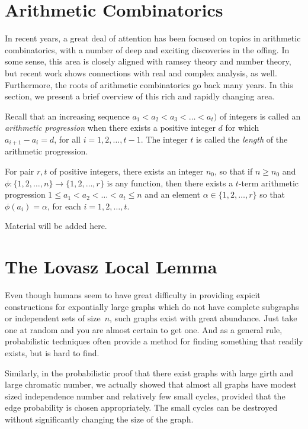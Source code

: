 \section{Arithmetic Combinatorics}

In recent years, a great deal of attention has been focused on
topics in arithmetic combinatorics, with a number of deep and
exciting discoveries in the offing.  In some sense, this area
is closely aligned with ramsey theory and number theory, but recent work 
shows connections with real and complex analysis, as well.  Furthermore,
the roots of arithmetic combinatorics go back many years.  In this section, 
we present a brief overview of this rich and rapidly changing area.

Recall that an increasing sequence $a_1<a_2<a_3<\dots<a_t)$ of integers is
called an \textit{arithmetic progression} when there exists a
positive integer $d$ for which $a_{i+1}-a_i=d$, for all $i=1,2,\dots,t-1$.
The integer $t$ is called the \textit{length} of the arithmetic progression.

\begin{theorem}
For pair $r,t$ of positive integers, there exists an integer $n_0$, so that
if $n\ge n_0$ and $\phi:\{1,2,\dots,n\}\rightarrow\{1,2,\dots,r\}$ is any
function, then there exists a $t$-term arithmetic progression
$1\le a_1<a_2<\dots<a_t\le n$ and an element $\alpha\in\{1,2,\dots,r\}$
so that $\phi(a_i)=\alpha$, for each $i=1,2,\dots,t$.
\end{theorem}

Material will be added here.

\section{The Lovasz Local Lemma}

Even though humans seem to have great difficulty in 
providing expicit constructions for expontially large graphs 
which do not have complete subgraphs or independent sets 
of size~$n$, such graphs exist with great abundance.  Just 
take one at random and you are almost certain to get one.  And as a general
rule, probabilistic techniques often provide a method for
finding something that readily exists, but is hard to find.

Similarly, in the probabilistic proof that there exist
graphs with large girth and large chromatic number, we actually
showed that almost all graphs have modest sized independence
number and relatively few small cycles, provided that the
edge probability is chosen appropriately. The small cycles can
be destroyed without significantly changing the size of the
graph.

